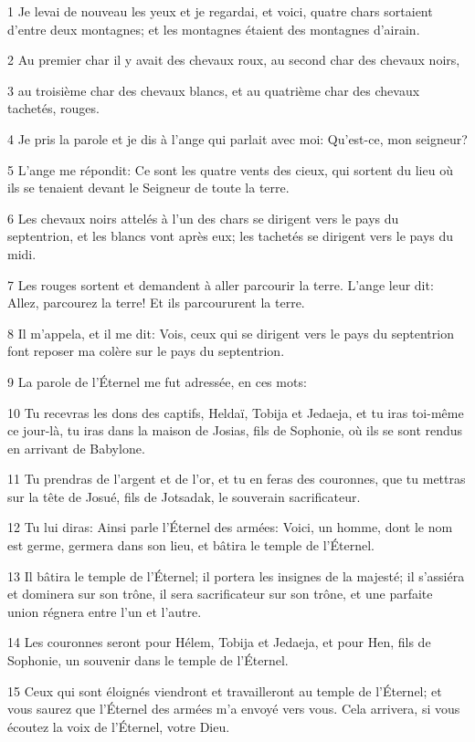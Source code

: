 \par 1 Je levai de nouveau les yeux et je regardai, et voici, quatre chars sortaient d'entre deux montagnes; et les montagnes étaient des montagnes d'airain.
\par 2 Au premier char il y avait des chevaux roux, au second char des chevaux noirs,
\par 3 au troisième char des chevaux blancs, et au quatrième char des chevaux tachetés, rouges.
\par 4 Je pris la parole et je dis à l'ange qui parlait avec moi: Qu'est-ce, mon seigneur?
\par 5 L'ange me répondit: Ce sont les quatre vents des cieux, qui sortent du lieu où ils se tenaient devant le Seigneur de toute la terre.
\par 6 Les chevaux noirs attelés à l'un des chars se dirigent vers le pays du septentrion, et les blancs vont après eux; les tachetés se dirigent vers le pays du midi.
\par 7 Les rouges sortent et demandent à aller parcourir la terre. L'ange leur dit: Allez, parcourez la terre! Et ils parcoururent la terre.
\par 8 Il m'appela, et il me dit: Vois, ceux qui se dirigent vers le pays du septentrion font reposer ma colère sur le pays du septentrion.
\par 9 La parole de l'Éternel me fut adressée, en ces mots:
\par 10 Tu recevras les dons des captifs, Heldaï, Tobija et Jedaeja, et tu iras toi-même ce jour-là, tu iras dans la maison de Josias, fils de Sophonie, où ils se sont rendus en arrivant de Babylone.
\par 11 Tu prendras de l'argent et de l'or, et tu en feras des couronnes, que tu mettras sur la tête de Josué, fils de Jotsadak, le souverain sacrificateur.
\par 12 Tu lui diras: Ainsi parle l'Éternel des armées: Voici, un homme, dont le nom est germe, germera dans son lieu, et bâtira le temple de l'Éternel.
\par 13 Il bâtira le temple de l'Éternel; il portera les insignes de la majesté; il s'assiéra et dominera sur son trône, il sera sacrificateur sur son trône, et une parfaite union régnera entre l'un et l'autre.
\par 14 Les couronnes seront pour Hélem, Tobija et Jedaeja, et pour Hen, fils de Sophonie, un souvenir dans le temple de l'Éternel.
\par 15 Ceux qui sont éloignés viendront et travailleront au temple de l'Éternel; et vous saurez que l'Éternel des armées m'a envoyé vers vous. Cela arrivera, si vous écoutez la voix de l'Éternel, votre Dieu.

